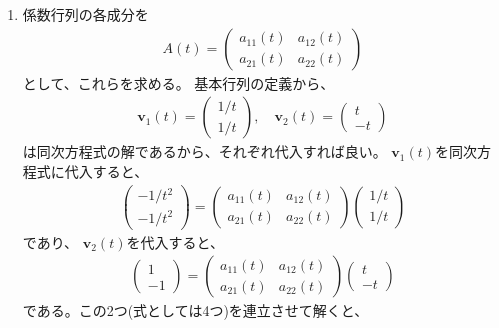 \documentclass{jsarticle}
\begin{document}
\begin{enumerate}
\item 係数行列の各成分を
\begin{eqnarray}
A(t)=\left(
\begin{array}{cc}
a_{11}(t) & a_{12}(t)\\
a_{21}(t) & a_{22}(t)
\end{array}\right)
\end{eqnarray}
として、これらを求める。
基本行列の定義から、
\begin{eqnarray}
\boldsymbol{v}_{1}(t)=\left(
\begin{array}{c}
1/t\\
1/t
\end{array}
\right),\quad
\boldsymbol{v}_{2}(t)=\left(
\begin{array}{c}
t\\
-t
\end{array}
\right)
\end{eqnarray}
は同次方程式の解であるから、それぞれ代入すれば良い。
$\boldsymbol{v}_{1}(t)$を同次方程式に代入すると、
\begin{eqnarray}
\left(
\begin{array}{c}
-1/t^{2}\\
-1/t^{2}
\end{array}\right)=
\left(
\begin{array}{cc}
a_{11}(t) & a_{12}(t)\\
a_{21}(t) & a_{22}(t)
\end{array}\right)
\left(
\begin{array}{c}
1/t\\
1/t
\end{array}\right)
\end{eqnarray}
であり、
$\boldsymbol{v}_{2}(t)$を代入すると、
\begin{eqnarray}
\left(
\begin{array}{c}
1\\
-1
\end{array}\right)=
\left(
\begin{array}{cc}
a_{11}(t) & a_{12}(t)\\
a_{21}(t) & a_{22}(t)
\end{array}\right)
\left(
\begin{array}{c}
t\\
-t
\end{array}\right)
\end{eqnarray}
である。この2つ(式としては4つ)を連立させて解くと、
\begin{eqnarray}

\end{eqnarray}
\end{enumerate}
\end{document}
